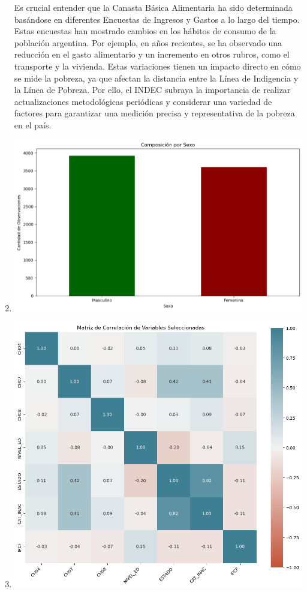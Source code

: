 \documentclass[a4paper,12pt]{article}
\begin{document}
\begin{enumerate}
Es crucial entender que la Canasta Básica Alimentaria ha sido determinada basándose en diferentes Encuestas de Ingresos y Gastos a lo largo del tiempo. Estas encuestas han mostrado cambios en los hábitos de consumo de la población argentina. Por ejemplo, en años recientes, se ha observado una reducción en el gasto alimentario y un incremento en otros rubros, como el transporte y la vivienda. Estas variaciones tienen un impacto directo en cómo se mide la pobreza, ya que afectan la distancia entre la Línea de Indigencia y la Línea de Pobreza. Por ello, el INDEC subraya la importancia de realizar actualizaciones metodológicas periódicas y considerar una variedad de factores para garantizar una medición precisa y representativa de la pobreza en el país.  \normalsize  
\item \includegraphics[width=1.0\linewidth]{compo.png}
 \normalsize 
\item \includegraphics[width=1.0\linewidth]{matriz.png} \normalsize 
 \normalsize

\end{enumerate}
\end{document}
